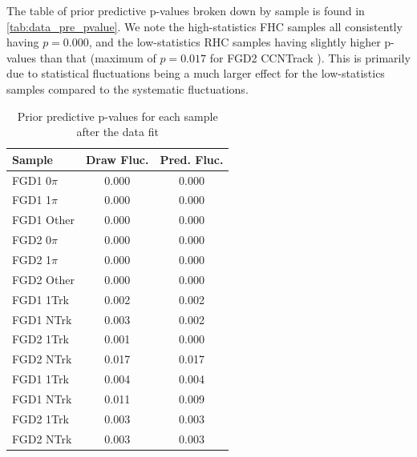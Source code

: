 The table of prior predictive p-values broken down by sample is found in \autoref{tab:data_pre_pvalue}. We note the high-statistics FHC samples all consistently having $p=0.000$, and the low-statistics RHC samples having slightly higher p-values than that (maximum of $p=0.017$ for FGD2 CCNTrack \numubar). This is primarily due to statistical fluctuations being a much larger effect for the low-statistics samples compared to the systematic fluctuations.
\begin{table}[h]
	\centering
	\begin{tabular}{l | c c }
		\hline \hline
		Sample & Draw Fluc. & Pred. Fluc. \\
		\hline
		FGD1 0$\pi$ & 0.000 & 0.000 \\
		FGD1 1$\pi$ & 0.000 & 0.000 \\
		FGD1 Other  & 0.000 & 0.000 \\
		\hline
		FGD2 0$\pi$ & 0.000 & 0.000 \\
		FGD2 1$\pi$ & 0.000 & 0.000 \\
		FGD2 Other  & 0.000 & 0.000 \\
		\hline
		FGD1 1Trk & 0.002 & 0.002 \\
		FGD1 NTrk & 0.003 & 0.002 \\
		FGD2 1Trk & 0.001 & 0.000 \\
		FGD2 NTrk & 0.017 & 0.017 \\
		\hline
		FGD1 \numu 1Trk & 0.004 & 0.004 \\
		FGD1 \numu NTrk & 0.011 & 0.009 \\
		FGD2 \numu 1Trk & 0.003 & 0.003 \\
		FGD2 \numu NTrk & 0.003 & 0.003 \\
		\hline
		\hline
	\end{tabular}
	\caption{Prior predictive p-values for each sample after the data fit}
	\label{tab:data_pre_pvalue}
\end{table}

